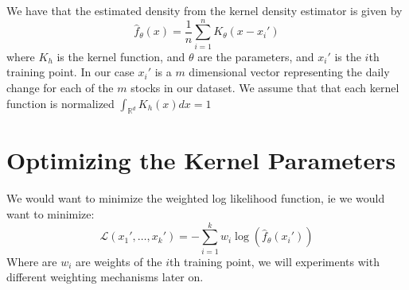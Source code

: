 \documentclass[12pt]{article}
\author{Lawrence Liu}
\begin{document}
We have that the estimated density from the kernel density estimator is given by
\begin{equation}
\hat{f}_{\theta}(x) = \frac{1}{n} \sum_{i=1}^n K_{\theta}(x-x_i')
\end{equation}
where $K_h$ is the kernel function, and $\theta$ are the parameters, and $x_i'$ is the $i$th training point. 
In our case $x_i'$ is a $m$ dimensional vector representing the daily change for each of the $m$ stocks in our dataset.
We assume that that each kernel function is normalized $\int_{\mathbb{R}^d} K_h(x) dx = 1$
\section*{Optimizing the Kernel Parameters}
We would want to minimize the weighted log likelihood function, ie we would want to minimize:
\begin{equation}
    \mathcal{L}(x_1',\dots,x_k') = -\sum_{i=1}^k w_i\log(\hat{f}_{\theta}(x_i'))
\end{equation}
Where are $w_i$ are weights of the $i$th training point, we will experiments with different weighting mechanisms later on.
\end{document}
